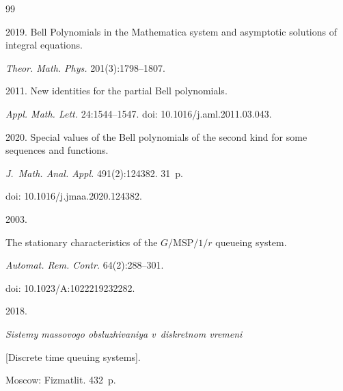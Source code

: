 {{\begin{thebibliography}{99}



 2019. Bell Polynomials in the Mathematica system and asymptotic solutions of integral equations. 

\textit{Theor. Math. Phys.} 201(3):1798--1807. 










 2011. New identities for the partial Bell polynomials. 

 \textit{Appl. Math. Lett.} 24:1544--1547. doi: 10.1016\!/\!j.aml.2011.03.043.

 




 2020. Special values of the Bell polynomials of the second kind for some sequences and functions. 

 \textit{J.~Math. Anal. Appl.} 491(2):124382. 31~p.

doi: 10.1016\!/\!j.jmaa.2020.124382.







 2003. 

The stationary characteristics of the $G/\mathrm{MSP}/1/r$ queueing system.

\textit{Automat. Rem. Contr.} 64(2):288--301.

doi: 10.1023\!/\!A:1022219232282.







 2018.

\textit{Sistemy massovogo obsluzhivaniya v~diskretnom vremeni}

[Discrete time queuing systems].

Moscow: Fizmatlit. 432~p.




\end{thebibliography}}}
